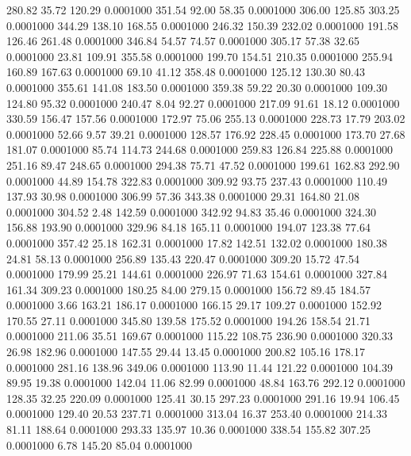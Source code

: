  280.82   35.72  120.29   0.0001000
 351.54   92.00   58.35   0.0001000
 306.00  125.85  303.25   0.0001000
 344.29  138.10  168.55   0.0001000
 246.32  150.39  232.02   0.0001000
 191.58  126.46  261.48   0.0001000
 346.84   54.57   74.57   0.0001000
 305.17   57.38   32.65   0.0001000
  23.81  109.91  355.58   0.0001000
 199.70  154.51  210.35   0.0001000
 255.94  160.89  167.63   0.0001000
  69.10   41.12  358.48   0.0001000
 125.12  130.30   80.43   0.0001000
 355.61  141.08  183.50   0.0001000
 359.38   59.22   20.30   0.0001000
 109.30  124.80   95.32   0.0001000
 240.47    8.04   92.27   0.0001000
 217.09   91.61   18.12   0.0001000
 330.59  156.47  157.56   0.0001000
 172.97   75.06  255.13   0.0001000
 228.73   17.79  203.02   0.0001000
  52.66    9.57   39.21   0.0001000
 128.57  176.92  228.45   0.0001000
 173.70   27.68  181.07   0.0001000
  85.74  114.73  244.68   0.0001000
 259.83  126.84  225.88   0.0001000
 251.16   89.47  248.65   0.0001000
 294.38   75.71   47.52   0.0001000
 199.61  162.83  292.90   0.0001000
  44.89  154.78  322.83   0.0001000
 309.92   93.75  237.43   0.0001000
 110.49  137.93   30.98   0.0001000
 306.99   57.36  343.38   0.0001000
  29.31  164.80   21.08   0.0001000
 304.52    2.48  142.59   0.0001000
 342.92   94.83   35.46   0.0001000
 324.30  156.88  193.90   0.0001000
 329.96   84.18  165.11   0.0001000
 194.07  123.38   77.64   0.0001000
 357.42   25.18  162.31   0.0001000
  17.82  142.51  132.02   0.0001000
 180.38   24.81   58.13   0.0001000
 256.89  135.43  220.47   0.0001000
 309.20   15.72   47.54   0.0001000
 179.99   25.21  144.61   0.0001000
 226.97   71.63  154.61   0.0001000
 327.84  161.34  309.23   0.0001000
 180.25   84.00  279.15   0.0001000
 156.72   89.45  184.57   0.0001000
   3.66  163.21  186.17   0.0001000
 166.15   29.17  109.27   0.0001000
 152.92  170.55   27.11   0.0001000
 345.80  139.58  175.52   0.0001000
 194.26  158.54   21.71   0.0001000
 211.06   35.51  169.67   0.0001000
 115.22  108.75  236.90   0.0001000
 320.33   26.98  182.96   0.0001000
 147.55   29.44   13.45   0.0001000
 200.82  105.16  178.17   0.0001000
 281.16  138.96  349.06   0.0001000
 113.90   11.44  121.22   0.0001000
 104.39   89.95   19.38   0.0001000
 142.04   11.06   82.99   0.0001000
  48.84  163.76  292.12   0.0001000
 128.35   32.25  220.09   0.0001000
 125.41   30.15  297.23   0.0001000
 291.16   19.94  106.45   0.0001000
 129.40   20.53  237.71   0.0001000
 313.04   16.37  253.40   0.0001000
 214.33   81.11  188.64   0.0001000
 293.33  135.97   10.36   0.0001000
 338.54  155.82  307.25   0.0001000
   6.78  145.20   85.04   0.0001000
